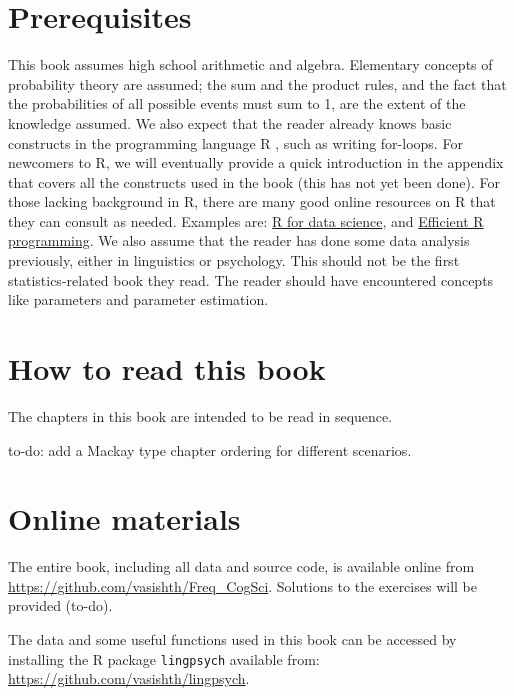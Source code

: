 \documentclass[
  12pt,
]{krantz}
\theoremstyle{definition}
\theoremstyle{definition}
\theoremstyle{definition}
\theoremstyle{definition}
\theoremstyle{remark}
\begin{document}
\hypertarget{prerequisites}{%
\section*{Prerequisites}\label{prerequisites}}


This book assumes high school arithmetic and algebra. Elementary concepts of probability theory are assumed; the sum and the product rules, and the fact that the probabilities of all possible events must sum to 1, are the extent of the knowledge assumed. We also expect that the reader already knows basic constructs in the programming language R \citep{R-base}, such as writing for-loops. For newcomers to R, we will eventually provide a quick introduction in the appendix that covers all the constructs used in the book (this has not yet been done). For those lacking background in R, there are many good online resources on R that they can consult as needed. Examples are: \href{https://r4ds.had.co.nz/}{R for data science}, and \href{https://csgillespie.github.io/efficientR/}{Efficient R programming}. We also assume that the reader has done some data analysis previously, either in linguistics or psychology. This should not be the first statistics-related book they read. The reader should have encountered concepts like parameters and parameter estimation.

\hypertarget{how-to-read-this-book}{%
\section*{How to read this book}\label{how-to-read-this-book}}


The chapters in this book are intended to be read in sequence.

to-do: add a Mackay type chapter ordering for different scenarios.

\hypertarget{online-materials}{%
\section*{Online materials}\label{online-materials}}


The entire book, including all data and source code, is available online from \url{https://github.com/vasishth/Freq_CogSci}. Solutions to the exercises will be provided (to-do).

The data and some useful functions used in this book can be accessed by installing the R package \texttt{lingpsych} available from: \url{https://github.com/vasishth/lingpsych}.
\end{document}

